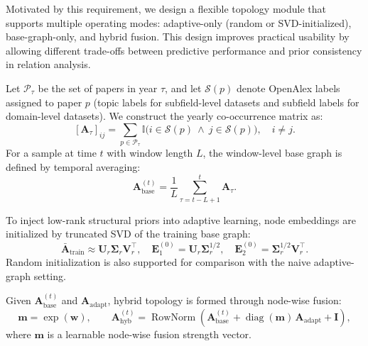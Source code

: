 \documentclass[runningheads]{llncs}
\begin{document}
Motivated by this requirement, we design a flexible topology module that supports multiple operating modes: adaptive-only (random or SVD-initialized), base-graph-only, and hybrid fusion. This design improves practical usability by allowing different trade-offs between predictive performance and prior consistency in relation analysis.

Let $\mathcal{P}_{\tau}$ be the set of papers in year $\tau$, and let $\mathcal{S}(p)$ denote OpenAlex labels assigned to paper $p$ (topic labels for subfield-level datasets and subfield labels for domain-level datasets). We construct the yearly co-occurrence matrix as:
\begin{equation}
\left[\mathbf{A}_{\tau}\right]_{ij}
=
\sum_{p\in\mathcal{P}_{\tau}}
\mathbb{I}\!\bigl(i\in\mathcal{S}(p)\ \wedge\ j\in\mathcal{S}(p)\bigr),
\quad i\neq j.
\end{equation}
For a sample at time $t$ with window length $L$, the window-level base graph is defined by temporal averaging:
\begin{equation}
\mathbf{A}^{(t)}_{\text{base}} = \frac{1}{L}\sum_{\tau=t-L+1}^{t}\mathbf{A}_{\tau}.
\end{equation}

To inject low-rank structural priors into adaptive learning, node embeddings are initialized by truncated SVD of the training base graph:
\begin{equation}
\bar{\mathbf{A}}_{\text{train}} \approx \mathbf{U}_{r}\mathbf{\Sigma}_{r}\mathbf{V}_{r}^{\top},\quad
\mathbf{E}_{1}^{(0)}=\mathbf{U}_{r}\mathbf{\Sigma}_{r}^{1/2},\quad
\mathbf{E}_{2}^{(0)}=\mathbf{\Sigma}_{r}^{1/2}\mathbf{V}_{r}^{\top}.
\end{equation}
Random initialization is also supported for comparison with the naive adaptive-graph setting.

Given $\mathbf{A}^{(t)}_{\text{base}}$ and $\mathbf{A}_{\text{adapt}}$, hybrid topology is formed through node-wise fusion:
\begin{equation}
\mathbf{m}=\exp(\mathbf{w}),\qquad
\mathbf{A}^{(t)}_{\text{hyb}}=
\operatorname{RowNorm}\!\left(
\mathbf{A}^{(t)}_{\text{base}}+
\operatorname{diag}(\mathbf{m})\,\mathbf{A}_{\text{adapt}}+\mathbf{I}
\right),
\end{equation}
where $\mathbf{m}$ is a learnable node-wise fusion strength vector.
\end{document}
